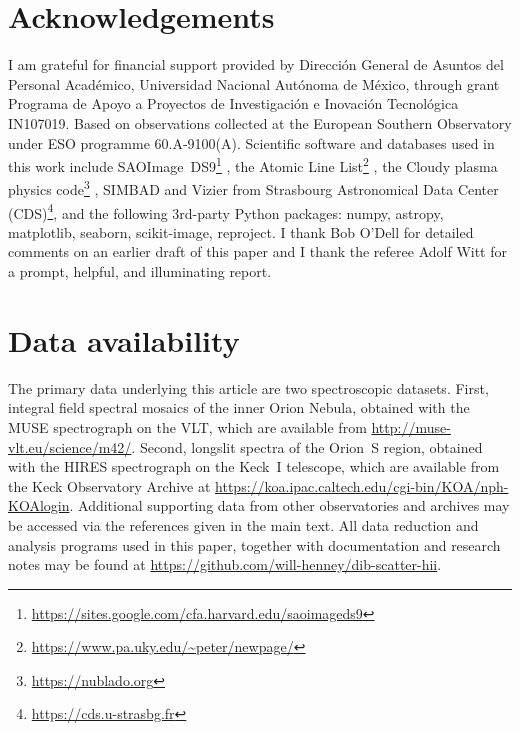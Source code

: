 \documentclass[useAMS, usenatbib, a4paper]{mnras}
\begin{document}
\section*{Acknowledgements}
I am grateful for financial support provided by
\foreignlanguage{spanish}{
  Dirección General de Asuntos del Personal Académico,
  Universidad Nacional Autónoma de México},
through grant
\foreignlanguage{spanish}{
  Programa de Apoyo a Proyectos de Investigación
  e Inovación Tecnológica}
IN107019.
Based on observations collected at the European Southern Observatory
under ESO programme 60.A-9100(A).
Scientific software and databases used in this work include
SAOImage~DS9\footnote{\url{https://sites.google.com/cfa.harvard.edu/saoimageds9}} \citep{Joye:2003a},
the Atomic Line List\footnote{\url{https://www.pa.uky.edu/~peter/newpage/}} \citep{Van-Hoof:2018a},
the Cloudy plasma physics code\footnote{\url{https://nublado.org}}
\citep{Ferland:2017a},
SIMBAD and Vizier from Strasbourg Astronomical Data Center (CDS)\footnote{\url{https://cds.u-strasbg.fr}},
and the following 3rd-party Python packages:
numpy, astropy, matplotlib, seaborn, scikit-image, reproject.
I thank Bob O'Dell for detailed comments on an earlier draft of this paper
and I thank the referee Adolf Witt for a prompt, helpful, and illuminating report.


\section*{Data availability}
\label{sec:data-availability}

The primary data underlying this article are two spectroscopic datasets.
First, integral field spectral mosaics of the inner Orion Nebula,
obtained with the MUSE spectrograph on the VLT,
which are available from \url{http://muse-vlt.eu/science/m42/}.
Second, longslit spectra of the Orion~S region,
obtained with the HIRES spectrograph on the Keck~I telescope,
which are available from the Keck Observatory Archive at
\url{https://koa.ipac.caltech.edu/cgi-bin/KOA/nph-KOAlogin}.
Additional supporting data from other observatories and archives
may be accessed via the references given in the main text.
All data reduction and analysis programs used in this paper,
together with documentation and research notes may be found at
\url{https://github.com/will-henney/dib-scatter-hii}.
\end{document}
